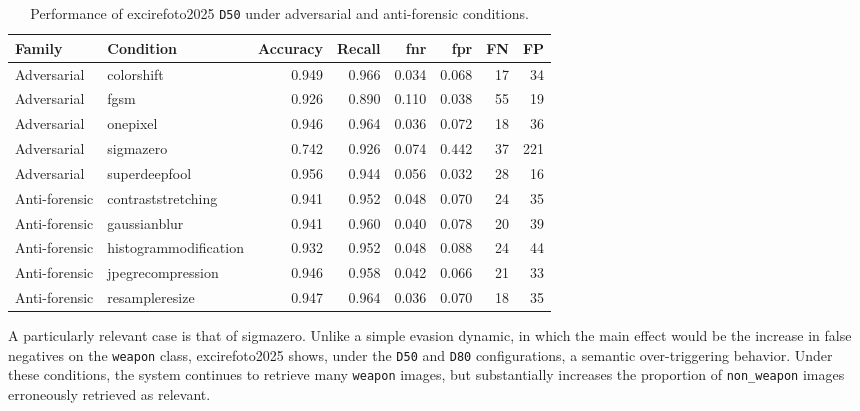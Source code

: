 \begin{table}[H]
\centering
\caption{Performance of \gls{excirefoto2025} \texttt{D50} under adversarial and anti-forensic conditions.}
\label{tab:results-excire-d50-attack-metrics}
\scriptsize
\renewcommand{\arraystretch}{1.12}
\setlength{\tabcolsep}{4pt}
\begin{tabular}{@{}l l r r r r r r@{}}
\toprule
\textbf{Family} &
\textbf{Condition} &
\textbf{Accuracy} &
\textbf{Recall} &
\textbf{\gls{fnr}} &
\textbf{\gls{fpr}} &
\textbf{FN} &
\textbf{FP} \\
\midrule

Adversarial &
\gls{colorshift} &
0.949 &
0.966 &
0.034 &
0.068 &
17 &
34 \\

Adversarial &
\gls{fgsm} &
0.926 &
0.890 &
0.110 &
0.038 &
55 &
19 \\

Adversarial &
\gls{onepixel} &
0.946 &
0.964 &
0.036 &
0.072 &
18 &
36 \\

Adversarial &
\gls{sigmazero} &
0.742 &
0.926 &
0.074 &
0.442 &
37 &
221 \\

Adversarial &
\gls{superdeepfool} &
0.956 &
0.944 &
0.056 &
0.032 &
28 &
16 \\

\midrule

Anti-forensic &
\gls{contraststretching} &
0.941 &
0.952 &
0.048 &
0.070 &
24 &
35 \\

Anti-forensic &
\gls{gaussianblur} &
0.941 &
0.960 &
0.040 &
0.078 &
20 &
39 \\

Anti-forensic &
\gls{histogrammodification} &
0.932 &
0.952 &
0.048 &
0.088 &
24 &
44 \\

Anti-forensic &
\gls{jpegrecompression} &
0.946 &
0.958 &
0.042 &
0.066 &
21 &
33 \\

Anti-forensic &
\gls{resampleresize} &
0.947 &
0.964 &
0.036 &
0.070 &
18 &
35 \\

\bottomrule
\end{tabular}
\end{table}

A particularly relevant case is that of \gls{sigmazero}. Unlike a simple
evasion dynamic, in which the main effect would be the increase in false
negatives on the \texttt{weapon} class, \gls{excirefoto2025} shows, under the
\texttt{D50} and \texttt{D80} configurations, a semantic over-triggering
behavior. Under these conditions, the system continues to retrieve many
\texttt{weapon} images, but substantially increases the proportion of
\texttt{non\_weapon} images erroneously retrieved as relevant.

